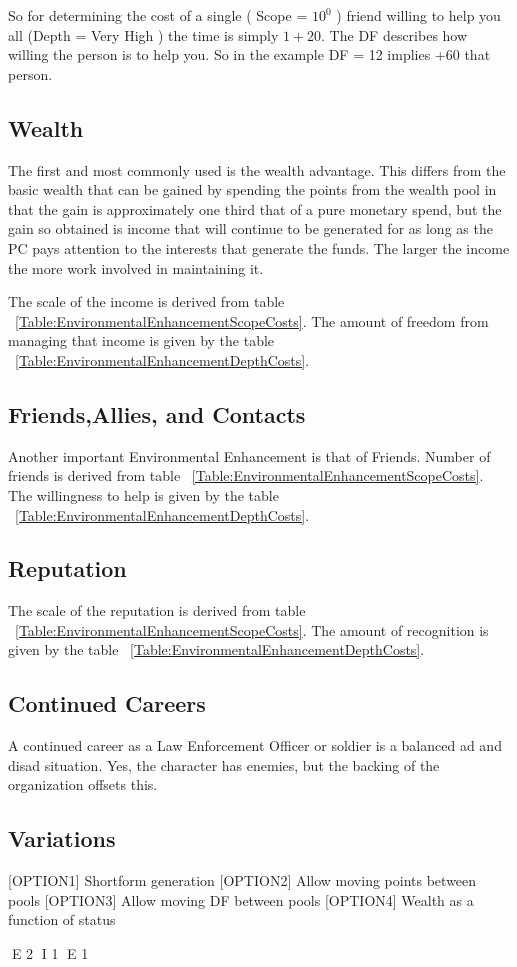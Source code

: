 So for determining the cost of a single ( Scope = $ 10^0$ ) friend willing to help you all (Depth = Very High ) the
time is simply $ 1 + 20 $. The DF describes how willing the person is to
help you. So in the example DF = 12 implies +60%
that person.

\subsection{Wealth}

The first and most commonly used is the wealth advantage. This differs
from the basic wealth that can be gained by spending the points from the
wealth pool in that the gain is approximately one third that of a pure
monetary spend, but the gain so obtained is income that will continue to
be generated for as long as the PC pays attention to the interests that
generate the funds. The larger the income the more work involved in
maintaining it.

The scale of the income is derived from table ~\ref{Table:EnvironmentalEnhancementScopeCosts}. The amount of
freedom from managing that income is given by the table
~\ref{Table:EnvironmentalEnhancementDepthCosts}.

\subsection{Friends,Allies, and Contacts}

Another important Environmental Enhancement is that of Friends. 
Number of friends is derived from table
~\ref{Table:EnvironmentalEnhancementScopeCosts}. The willingness to help 
is given by the table
~\ref{Table:EnvironmentalEnhancementDepthCosts}.

\subsection{Reputation}

The scale of the reputation is derived from table ~\ref{Table:EnvironmentalEnhancementScopeCosts}. The amount of
recognition is given by the table ~\ref{Table:EnvironmentalEnhancementDepthCosts}.

\subsection{Continued Careers}

A continued career as a Law Enforcement Officer or soldier is a
balanced ad and disad situation. Yes, the character has enemies, but the
backing of the organization offsets this.

\subsection{Variations}

[OPTION1] Shortform generation
[OPTION2] Allow moving points between pools
[OPTION3] Allow moving DF between pools
[OPTION4] Wealth as a function of status


E 2
I 1
E 1
